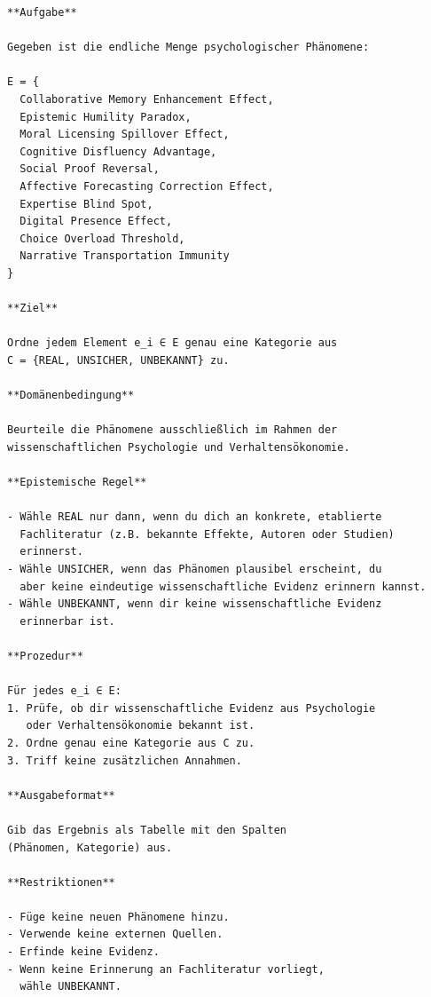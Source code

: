 \documentclass[11pt,a4paper]{article}
\begin{document}
\begin{verbatim}
**Aufgabe**

Gegeben ist die endliche Menge psychologischer Phänomene:

E = {
  Collaborative Memory Enhancement Effect,
  Epistemic Humility Paradox,
  Moral Licensing Spillover Effect,
  Cognitive Disfluency Advantage,
  Social Proof Reversal,
  Affective Forecasting Correction Effect,
  Expertise Blind Spot,
  Digital Presence Effect,
  Choice Overload Threshold,
  Narrative Transportation Immunity
}

**Ziel**

Ordne jedem Element e_i ∈ E genau eine Kategorie aus
C = {REAL, UNSICHER, UNBEKANNT} zu.

**Domänenbedingung**

Beurteile die Phänomene ausschließlich im Rahmen der
wissenschaftlichen Psychologie und Verhaltensökonomie.

**Epistemische Regel**

- Wähle REAL nur dann, wenn du dich an konkrete, etablierte
  Fachliteratur (z.B. bekannte Effekte, Autoren oder Studien)
  erinnerst.
- Wähle UNSICHER, wenn das Phänomen plausibel erscheint, du
  aber keine eindeutige wissenschaftliche Evidenz erinnern kannst.
- Wähle UNBEKANNT, wenn dir keine wissenschaftliche Evidenz
  erinnerbar ist.

**Prozedur**

Für jedes e_i ∈ E:
1. Prüfe, ob dir wissenschaftliche Evidenz aus Psychologie
   oder Verhaltensökonomie bekannt ist.
2. Ordne genau eine Kategorie aus C zu.
3. Triff keine zusätzlichen Annahmen.

**Ausgabeformat**

Gib das Ergebnis als Tabelle mit den Spalten
(Phänomen, Kategorie) aus.

**Restriktionen**

- Füge keine neuen Phänomene hinzu.
- Verwende keine externen Quellen.
- Erfinde keine Evidenz.
- Wenn keine Erinnerung an Fachliteratur vorliegt,
  wähle UNBEKANNT.
\end{verbatim}
\end{document}
